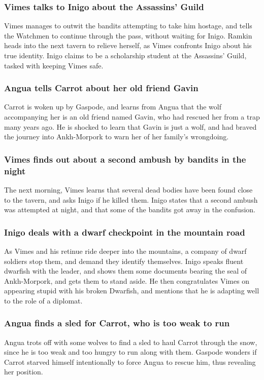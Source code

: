 \subsubsection{\Gls{Vimes} talks to \Gls{Inigo} about the Assassins' Guild}
\Gls{Vimes} manages to outwit the bandits attempting to take him hostage, and tells the Watchmen
to continue through the pass, without waiting for \Gls{Inigo}. \Gls{Ramkin} heads into the next
tavern to relieve herself, as \Gls{Vimes} confronts \Gls{Inigo} about his true identity. \Gls{Inigo}
claims to be a scholarship student at the Assassins' Guild, tasked with keeping \Gls{Vimes} safe.

\subsubsection{\Gls{Angua} tells \Gls{Carrot} about her old friend \Gls{Gavin}}
\Gls{Carrot} is woken up by \Gls{Gaspode}, and learns from \Gls{Angua} that the wolf accompanying
her is an old friend named \Gls{Gavin}, who had rescued her from a trap many years ago. He is
shocked to learn that \Gls{Gavin} is just a wolf, and had braved the journey into Ankh-Morpork to
warn her of her family's wrongdoing.

\subsubsection{\Gls{Vimes} finds out about a second ambush by bandits in the night}
The next morning, \Gls{Vimes} learns that several dead bodies have been found close to the tavern,
and asks \Gls{Inigo} if he killed them. \Gls{Inigo} states that a second ambush was attempted at
night, and that some of the bandits got away in the confusion.

\subsubsection{\Gls{Inigo} deals with a dwarf checkpoint in the mountain road}
As \Gls{Vimes} and his retinue ride deeper into the mountains, a company of dwarf soldiers stop
them, and demand they identify themselves. \Gls{Inigo} speaks fluent dwarfish with the leader, and
shows them some documents bearing the seal of Ankh-Morpork, and gets them to stand aside. He then
congratulates \Gls{Vimes} on appearing stupid with his broken Dwarfish, and mentions that he is
adapting well to the role of a diplomat.

\subsubsection{\Gls{Angua} finds a sled for \Gls{Carrot}, who is too weak to run}
\Gls{Angua} trots off with some wolves to find a sled to haul \Gls{Carrot} through the snow, since
he is too weak and too hungry to run along with them. \Gls{Gaspode} wonders if \Gls{Carrot} starved
himself intentionally to force \Gls{Angua} to rescue him, thus revealing her position.

